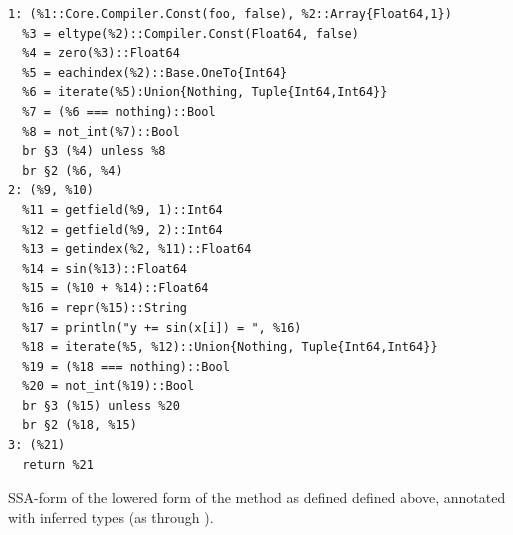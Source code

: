 \begin{lstfloat}[t]
\begin{lstlisting}[style=lstfloat]
1: (%1::Core.Compiler.Const(foo, false), %2::Array{Float64,1})
  %3 = eltype(%2)::Compiler.Const(Float64, false)
  %4 = zero(%3)::Float64
  %5 = eachindex(%2)::Base.OneTo{Int64}
  %6 = iterate(%5):Union{Nothing, Tuple{Int64,Int64}}
  %7 = (%6 === nothing)::Bool
  %8 = not_int(%7)::Bool
  br §3 (%4) unless %8
  br §2 (%6, %4)
2: (%9, %10)
  %11 = getfield(%9, 1)::Int64
  %12 = getfield(%9, 2)::Int64
  %13 = getindex(%2, %11)::Float64
  %14 = sin(%13)::Float64
  %15 = (%10 + %14)::Float64
  %16 = repr(%15)::String
  %17 = println("y += sin(x[i]) = ", %16)
  %18 = iterate(%5, %12)::Union{Nothing, Tuple{Int64,Int64}}
  %19 = (%18 === nothing)::Bool
  %20 = not_int(%19)::Bool
  br §3 (%15) unless %20
  br §2 (%18, %15)
3: (%21)
  return %21
\end{lstlisting}
  \caption{SSA-form of the lowered form of the method \protect{} as
    defined defined above, annotated with inferred types (as through
    \protect{}).\label{lst:foo-inferred}}
\end{lstfloat}

